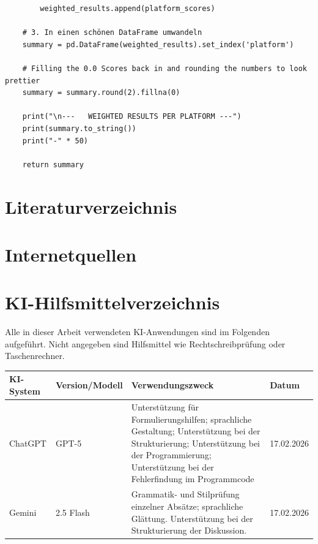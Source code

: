 \documentclass[12pt]{article}
\begin{document}
\begin{lstlisting}
        weighted_results.append(platform_scores)
        
    # 3. In einen schönen DataFrame umwandeln
    summary = pd.DataFrame(weighted_results).set_index('platform')
    
    # Filling the 0.0 Scores back in and rounding the numbers to look prettier
    summary = summary.round(2).fillna(0)
    
    print("\n---   WEIGHTED RESULTS PER PLATFORM ---")
    print(summary.to_string())
    print("-" * 50)

    return summary
\end{lstlisting}
\section{Literaturverzeichnis}
 
\togglefalse{abx@bool@giveninits}
\printbibliography[%
  filter=notinternet,
  title={Sonstige Quellen},
  heading=none
]
\section*{Internetquellen}
\printbibliography[%
filter=internet,
title={Internetquellen},
  heading=none
]
 
\newpage
\newpage
\section{KI-Hilfsmittelverzeichnis} 

Alle in dieser Arbeit verwendeten KI-Anwendungen sind im Folgenden aufgeführt. 
Nicht angegeben sind Hilfsmittel wie Rechtschreibprüfung oder Taschenrechner.
\vspace{0.5\baselineskip}

\begin{center}
\begin{tabular}{| p{2.5cm} | p{2.7cm} | p{6.0cm} | p{2.0cm} |}
\hline
\textbf{KI-System} & \textbf{Version/Modell} & \textbf{Verwendungszweck} & \textbf{Datum} \\
\hline
ChatGPT & GPT-5 & Unterstützung für Formulierungshilfen; sprachliche Gestaltung; Unterstützung bei der Strukturierung; Unterstützung bei der Programmierung; Unterstützung bei der Fehlerfindung im Programmcode & 17.02.2026 \\
\hline
Gemini & 2.5 Flash & Grammatik- und Stilprüfung einzelner Absätze; sprachliche Glättung. Unterstützung bei der Strukturierung der Diskussion. & 17.02.2026 \\
\hline
\hline
\end{tabular}
\end{center}
\end{document}
